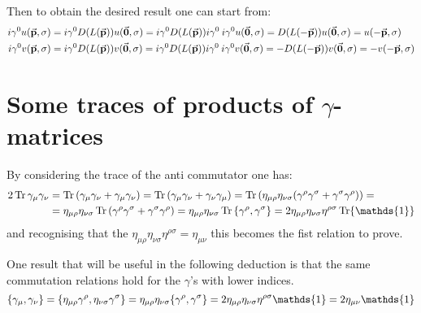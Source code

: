 \documentclass[11pt, oneside]{article}   	%
\begin{document}
\begin{enumerate}[label=\alph*)]
Then to obtain the desired result one can start from:
\begin{align*}
	i\gamma^0 u( \va{p}, \sigma) &= i \gamma^0D\qty(L\qty(\va{p})) u (\va{0}, \sigma) =  i\gamma^0 D\qty(L(\va{p})) i\gamma^0 \: i\gamma^0 u (\va{0}, \sigma) =  D\qty(L(-\va{p})) u (\va{0}, \sigma) = u(-\va{p}, \sigma) \\
	i\gamma^0 v( \va{p}, \sigma) &= i \gamma^0D\qty(L\qty(\va{p})) v(\va{0}, \sigma) =  i\gamma^0 D\qty(L(\va{p})) i\gamma^0 \: i\gamma^0 v(\va{0}, \sigma) =  -D\qty(L(-\va{p})) v(\va{0}, \sigma) = -v(-\va{p}, \sigma)
\end{align*}

\end{enumerate}

\section{Some traces of products of $\gamma$-matrices}

By considering the trace of the anti commutator one has:
\begin{align*}
	 2 \Tr \gamma_\mu \gamma_\nu &= \Tr \qty(\gamma_\mu \gamma_\nu + \gamma_\mu \gamma_\nu) = \Tr \qty(\gamma_\mu \gamma_\nu + \gamma_\nu \gamma_\mu) = \Tr \qty(\eta_{\mu\rho} \eta_{\nu\sigma} \qty(\gamma^\rho \gamma^\sigma + \gamma^\sigma \gamma^\rho) ) = \\
	 &= \eta_{\mu\rho} \eta_{\nu\sigma} \Tr \qty(\gamma^\rho \gamma^\sigma + \gamma^\sigma \gamma^\rho) = \eta_{\mu\rho} \eta_{\nu\sigma} \Tr \acomm{\gamma^\rho}{\gamma^\sigma} = 2\eta_{\mu\rho} \eta_{\nu\sigma} \eta^{\rho\sigma} \Tr \mathds{1}
\end{align*}
and recognising that the $\eta_{\mu\rho} \eta_{\nu\sigma} \eta^{\rho\sigma} = \eta_{\mu\nu}$ this becomes the fist relation to prove.

One result that will be useful in the following deduction is that the same commutation relations hold for the $\gamma$'s with lower indices.
\[
	\acomm{\gamma_\mu}{\gamma_\nu} = \acomm{\eta_{\mu\rho} \gamma^\rho}{\eta_{\nu\sigma} \gamma^{\sigma}} = \eta_{\mu\rho}\eta_{\nu\sigma} \acomm{\gamma^{\rho}}{\gamma^\sigma} = 2 \eta_{\mu\rho}\eta_{\nu\sigma} \eta^{\rho\sigma} \mathds{1} = 2 \eta_{\mu\nu} \mathds{1}
\]
\end{document}
